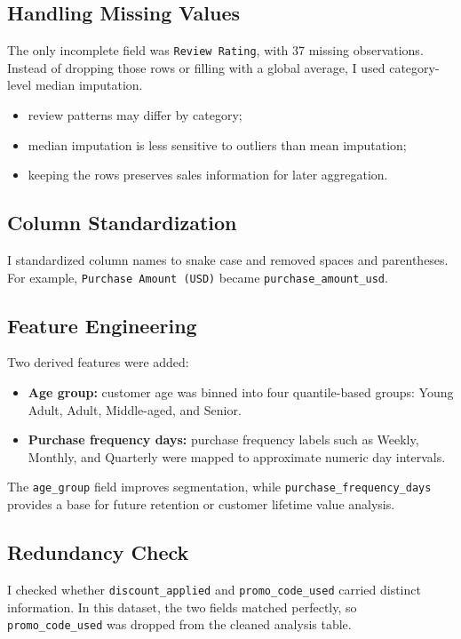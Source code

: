 \documentclass[12pt,a4paper]{article}
\begin{document}
\subsection{Handling Missing Values}
The only incomplete field was \texttt{Review Rating}, with 37 missing observations. Instead of dropping those rows or filling with a global average, I used category-level median imputation.
\begin{itemize}
  \item review patterns may differ by category;
  \item median imputation is less sensitive to outliers than mean imputation;
  \item keeping the rows preserves sales information for later aggregation.
\end{itemize}

\subsection{Column Standardization}
I standardized column names to snake case and removed spaces and parentheses. For example, \texttt{Purchase Amount (USD)} became \texttt{purchase\_amount\_usd}.

\subsection{Feature Engineering}
Two derived features were added:
\begin{itemize}
  \item \textbf{Age group:} customer age was binned into four quantile-based groups: Young Adult, Adult, Middle-aged, and Senior.
  \item \textbf{Purchase frequency days:} purchase frequency labels such as Weekly, Monthly, and Quarterly were mapped to approximate numeric day intervals.
\end{itemize}

The \texttt{age\_group} field improves segmentation, while \texttt{purchase\_frequency\_days} provides a base for future retention or customer lifetime value analysis.

\subsection{Redundancy Check}
I checked whether \texttt{discount\_applied} and \texttt{promo\_code\_used} carried distinct information. In this dataset, the two fields matched perfectly, so \texttt{promo\_code\_used} was dropped from the cleaned analysis table.
\end{document}
